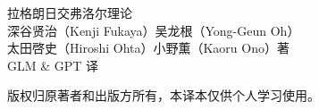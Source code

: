 \documentclass[UTF8,scheme=plain,fontset=windows,openany,11pt]{ctexbook}
\begin{document}
\frontmatter

\begin{titlepage}
  \centering
  \vspace*{3cm}
  {\heiti 拉格朗日交弗洛尔理论}\\[3cm]
  { 深谷贤治（Kenji Fukaya）\quad 吴龙根（Yong-Geun Oh）\\
   太田啓史（Hiroshi Ohta）\quad 小野薫（Kaoru Ono）著}\\[0.6cm]
  { GLM \& GPT 译}\\[4cm]
  \begin{minipage}{0.8\textwidth}\small
    版权归原著者和出版方所有，本译本仅供个人学习使用。
  \end{minipage}
  \vfill
\end{titlepage}

\tableofcontents


\let\liftcleardoublepage\cleardoublepage
\let\cleardoublepage\clearpage
\mainmatter
\BookIndexingtrue
\let\cleardoublepage\liftcleardoublepage


\BookIndexingfalse
\backmatter


\printindex


\end{document}
